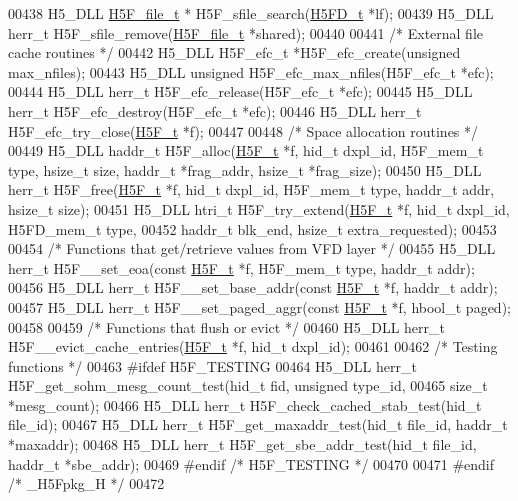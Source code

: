 \begin{DoxyCode}
00438 H5\_DLL \hyperlink{struct_h5_f__file__t}{H5F\_file\_t} * H5F\_sfile\_search(\hyperlink{struct_h5_f_d__t}{H5FD\_t} *lf);
00439 H5\_DLL herr\_t H5F\_sfile\_remove(\hyperlink{struct_h5_f__file__t}{H5F\_file\_t} *shared);
00440 
00441 \textcolor{comment}{/* External file cache routines */}
00442 H5\_DLL H5F\_efc\_t *H5F\_efc\_create(\textcolor{keywordtype}{unsigned} max\_nfiles);
00443 H5\_DLL \textcolor{keywordtype}{unsigned} H5F\_efc\_max\_nfiles(H5F\_efc\_t *efc);
00444 H5\_DLL herr\_t H5F\_efc\_release(H5F\_efc\_t *efc);
00445 H5\_DLL herr\_t H5F\_efc\_destroy(H5F\_efc\_t *efc);
00446 H5\_DLL herr\_t H5F\_efc\_try\_close(\hyperlink{struct_h5_f__t}{H5F\_t} *f);
00447 
00448 \textcolor{comment}{/* Space allocation routines */}
00449 H5\_DLL haddr\_t H5F\_alloc(\hyperlink{struct_h5_f__t}{H5F\_t} *f, hid\_t dxpl\_id, H5F\_mem\_t type, hsize\_t size, haddr\_t *frag\_addr, 
      hsize\_t *frag\_size);
00450 H5\_DLL herr\_t H5F\_free(\hyperlink{struct_h5_f__t}{H5F\_t} *f, hid\_t dxpl\_id, H5F\_mem\_t type, haddr\_t addr, hsize\_t size);
00451 H5\_DLL htri\_t H5F\_try\_extend(\hyperlink{struct_h5_f__t}{H5F\_t} *f, hid\_t dxpl\_id, H5FD\_mem\_t type, 
00452     haddr\_t blk\_end, hsize\_t extra\_requested);
00453 
00454 \textcolor{comment}{/* Functions that get/retrieve values from VFD layer */}
00455 H5\_DLL herr\_t H5F\_\_set\_eoa(\textcolor{keyword}{const} \hyperlink{struct_h5_f__t}{H5F\_t} *f, H5F\_mem\_t type, haddr\_t addr);
00456 H5\_DLL herr\_t H5F\_\_set\_base\_addr(\textcolor{keyword}{const} \hyperlink{struct_h5_f__t}{H5F\_t} *f, haddr\_t addr);
00457 H5\_DLL herr\_t H5F\_\_set\_paged\_aggr(\textcolor{keyword}{const} \hyperlink{struct_h5_f__t}{H5F\_t} *f, hbool\_t paged);
00458 
00459 \textcolor{comment}{/* Functions that flush or evict */}
00460 H5\_DLL herr\_t H5F\_\_evict\_cache\_entries(\hyperlink{struct_h5_f__t}{H5F\_t} *f, hid\_t dxpl\_id);
00461 
00462 \textcolor{comment}{/* Testing functions */}
00463 \textcolor{preprocessor}{#ifdef H5F\_TESTING}
00464 H5\_DLL herr\_t H5F\_get\_sohm\_mesg\_count\_test(hid\_t fid, \textcolor{keywordtype}{unsigned} type\_id,
00465     \textcolor{keywordtype}{size\_t} *mesg\_count);
00466 H5\_DLL herr\_t H5F\_check\_cached\_stab\_test(hid\_t file\_id);
00467 H5\_DLL herr\_t H5F\_get\_maxaddr\_test(hid\_t file\_id, haddr\_t *maxaddr);
00468 H5\_DLL herr\_t H5F\_get\_sbe\_addr\_test(hid\_t file\_id, haddr\_t *sbe\_addr);
00469 \textcolor{preprocessor}{#endif }\textcolor{comment}{/* H5F\_TESTING */}\textcolor{preprocessor}{}
00470 
00471 \textcolor{preprocessor}{#endif }\textcolor{comment}{/* \_H5Fpkg\_H */}\textcolor{preprocessor}{}
00472 
\end{DoxyCode}
